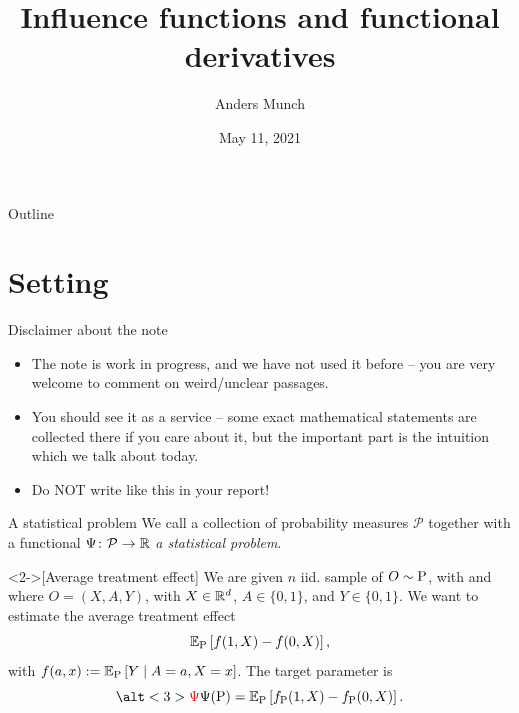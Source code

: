 \documentclass{beamer}\usepackage{listings}
\author{Anders Munch}
\date{May 11, 2021}
\title{Influence functions and functional derivatives}
\begin{document}
\maketitle
\begin{frame}{Outline}
\tableofcontents
\end{frame}

\section{Setting}
\label{sec:org30cdf70}
\begin{frame}[label={sec:org0054c97}]{Disclaimer about the note}
\begin{itemize}[<+->]
\item The note is work in progress, and we have not used it before -- you are very welcome to comment on
weird/unclear passages.
\item You should see it as a service -- some exact mathematical statements are collected there if you
care about it, but the important part is the intuition which we talk about today.
\item Do NOT write like this in your report!
\end{itemize}
\end{frame}
\begin{frame}[label={sec:orga61b148}]{A statistical problem}
We call a collection of probability measures \(\mathcal{P}\) together with a functional \(\TT \colon
\mathcal{P} \rightarrow \R\) \emph{a statistical problem}.

\vfill

\begin{example}<2->[Average treatment effect]
We are given $n$ iid. sample of $O \sim \P$, with  and where \(O= (X, A, Y)\), with \(X\in \R^d\),
\(A\in \lbrace 0,1\rbrace\), and \(Y\in\lbrace 0, 1\rbrace\). We want to estimate the average
treatment effect
\begin{equation*}
  \E_{\P}\left[ f(1, X) - f(0, X) \right],  
\end{equation*}
with $f(a, x) := \E_{\P}\left[ Y \mid A=a, X=x  \right]$. The target parameter is
\begin{equation*}
  \alt<3>{{\color{red}\TT}}{\TT}(\P) =  \E_{\P}\left[ f_{\P}(1, X) - f_{\P}(0, X) \right].
\end{equation*}
\end{example}
\end{frame}
\end{document}
